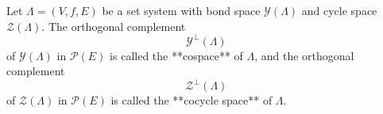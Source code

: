Let $\Lambda = (V, f, E)$ be a set system with bond space $\mathcal{Y}(\Lambda)$ and cycle space $\mathcal{Z}(\Lambda)$. The orthogonal complement
$$\mathcal{Y}^\perp(\Lambda)$$
of $\mathcal{Y}(\Lambda)$ in $\mathcal{P}(E)$ is called the **cospace** of $\Lambda$, and the orthogonal complement
$$\mathcal{Z}^\perp(\Lambda)$$
of $\mathcal{Z}(\Lambda)$ in $\mathcal{P}(E)$ is called the **cocycle space** of $\Lambda$.
